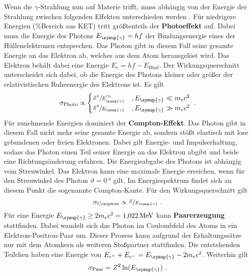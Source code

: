     Wenn die $\gamma$-Strahlung nun auf Materie trifft,
    muss abhängig von der Energie der Strahlung zwischen folgenden Effekten unterschieden werden \cite{radioaktivitaet}.
    Für niedrigere Energien (\%Bereich aus KET) tritt größtenteils der \textbf{Photoeffekt} auf.
    Dabei muss die Energie des Photons $E_{\symup{\gamma}} = hf$ der Bindungsenergie eines der Hüllenelektronen entsprechen.
    Das Photon gibt in diesem Fall seine gesamte Energie an das Elektron ab,
    welches aus dem Atom herausgelöst wird.
    Das Elektron behält dabei eine Energie $E_{e} = hf - E_\text{Bind}$.
    Der Wirkungsquerschnitt unterscheidet sich dabei,
    ob die Energie des Photons kleiner oder größer der relativistischen Ruheenergie des Elektrons ist.
    Es gilt
    \begin{equation*}
        \sigma_\text{Photo} \propto
        \begin{cases}
            \sfrac{Z^5}{E^{\sfrac{7}{2}}_{\symup{\gamma}}} & , E_{\symup{\gamma}} \ll m_{e} c^2 \\
            \sfrac{Z^5}{E_{\symup{\gamma}}} & , E_{\symup{\gamma}} \gg m_{e} c^2 \\
        \end{cases} \ .
    \end{equation*}
    Für zunehmende Energien dominiert der \textbf{Compton-Effekt}.
    Das Photon gibt in diesem Fall nicht mehr seine gesamte Energie ab,
    sondern stößt elastisch mit lose gebundenen oder freien Elektronen.
    Dabei gilt Energie- und Impulserhaltung,
    sodass das Photon einen Teil seiner Energie an das Elektron abgibt und beide eine Richtungsänderung erfahren.
    Die Energieabgabe des Photons ist abhängig vom Streuwinkel.
    Das Elektron kann eine maximale Energie erreichen,
    wenn für den Streuwinkel des Photon $\vartheta = \SI{0}{\degree}$ gilt.
    Im Energiespektrum findet sich an diesem Punkt die sogenannte Compton-Kante.
    Für den Wirkungsquerschnitt gilt
    \begin{equation*}
        \sigma_\text{Compton} \propto \sfrac{Z}{E_{\symup{\gamma}}} \ .
    \end{equation*}
    Für eine Energie $E_{\symup{\gamma}} \geq 2m_{e}c^2 = \SI{1.022}{\mega\eV}$ kann \textbf{Paarerzeugung} stattfinden.
    Dabei wandelt sich das Photon im Coulombfeld des Atoms in ein Elektron-Positron-Paar um.
    Dieser Prozess kann aufgrund der Erhaltungssätze nur mit dem Atomkern als weiteren Stoßpartner stattfinden.
    Die entstehenden Teilchen haben eine Energie von $E_{e^{+}} + E_{e^{-}} = E_{\symup{\gamma}} - 2m_{e}c^2$.
    Weiterhin gilt
    \begin{equation*}
        \sigma_\text{Paar} = Z^2 \ln(E_{\symup{\gamma}}) \ .
    \end{equation*}

